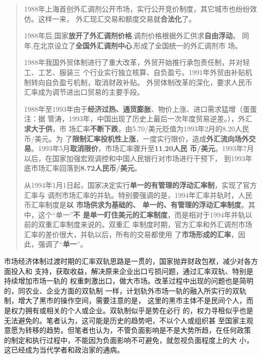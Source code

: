 \begin{quotation}
1988年上海首创外汇调剂公开市场，实行公开竞价制度，其它城市也纷纷效仿。这样一来，
外汇现汇交易和额度交易就\textbf{合法化}了。

1988年后,国家\textbf{放开了外汇调剂价格},调剂价格根据外汇供求\textbf{自由浮动}。
同年,在北京设立了\textbf{全国外汇调剂中心},形成了全国统一的外汇调剂市
场。\cite{wangqiangshehui}

1988年我国外贸体制进行了重大改革，外贸开始推行承包责任制，并对轻工、工艺、服装三
个行业实行独立核算、自负盈亏。1991年外贸由补贴机制转向自负盈亏机制，取消财政补贴。
外贸体制改革的深化，要求人民币汇率成为调节进出口贸易的主要手段。

1988年至1993年由于\textbf{经济过热、通货膨胀}、物价上涨、进口需求猛增（蛋蛋注：据
管涛，1993年，中国出现了历史上最后一次年度贸易逆差。），外汇\textbf{求大于供}，市
场汇率\textbf{不断下跌}，由5.70/美元贬值为1993年2月的8.20人民币/美元。为
了\textbf{限制汇率投机性上涨}，一度实行限价，造成\textbf{外汇流向场外交
  易}。1993年5月\textbf{取消限价}，市场汇率骤升至\textbf{11.20人民
  币/美元}。1993年7月以后，在国家加强宏观调控和中国人民银行对市场进行干预下，
到1993年底市场汇率回落到\textbf{8.72人民币/美元}。\cite{huilvshi}

从1994年1月1日起，国家决定实行\textbf{单一的有管理的浮动汇率制}，实现了官方汇率与
调剂市场汇率的并轨。特别要强调的是，1994年汇率并轨时，人民币汇率制度是\textbf{以
  市场供求为基础的、 单一的、有管理的浮动汇率制度}。其中，这个“单一”\textbf{不
  是单一盯住美元的汇率制度}，而是相对于1994年并轨以前的双重汇率制度来说的。双重汇
率制度时期，官方汇率和外汇调剂市场汇率的差价很大，并轨以后，所有的交易都使用
了\textbf{市场形成的汇率}，因此，强调了“\textbf{单一}”。\cite{guantaohuigai}
\end{quotation}

市场经济体制过渡时期的汇率双轨思路是一贯的，国家抛弃财政包袱，减少对各方面投入和
支持，获取收益，解决原来企业出口亏损问题，通过汇率双轨、特别是持续增加市场一轨的
权重刺激出口，做大市场。改革过程中出现的问题也是简明的，同农业、企业方面的双轨制
一样，计划轨外市场一轨的融入所实行的双轨制，增大了黑市的操作空间，需要注意的是，
这里的黑市主体不是民间个人，而是权力拥有或相关的个人或企业。双轨制似乎是势在必行
的，权力寻租似乎也是无法避免的。笔者认为，这可能是历史的趋势吧，不以个人或组织甚
至国家主观意愿为转移的趋势。但笔者也认为，不管负面影响是不是大势所趋，在任何政策
的制定和执行过程中，不能因为负面影响不可避免，就忽视负面程度上的大
小，这已经成为当代学者和政治家的通病。

